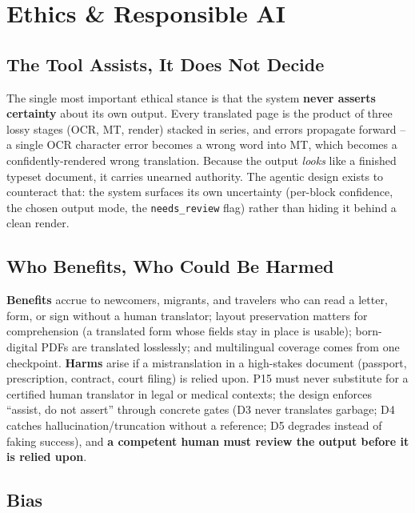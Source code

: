 \documentclass[12pt,a4paper]{article}
\begin{document}
\section{Ethics \& Responsible AI}

\subsection{The Tool Assists, It Does Not Decide}

The single most important ethical stance is that the system \textbf{never asserts certainty} about its own output. Every translated page is the product of three lossy stages (OCR, MT, render) stacked in series, and errors propagate forward -- a single OCR character error becomes a wrong word into MT, which becomes a confidently-rendered wrong translation. Because the output \emph{looks} like a finished typeset document, it carries unearned authority. The agentic design exists to counteract that: the system surfaces its own uncertainty (per-block confidence, the chosen output mode, the \texttt{needs\_review} flag) rather than hiding it behind a clean render.

\subsection{Who Benefits, Who Could Be Harmed}

\textbf{Benefits} accrue to newcomers, migrants, and travelers who can read a letter, form, or sign without a human translator; layout preservation matters for comprehension (a translated form whose fields stay in place is usable); born-digital PDFs are translated losslessly; and multilingual coverage comes from one checkpoint. \textbf{Harms} arise if a mistranslation in a high-stakes document (passport, prescription, contract, court filing) is relied upon. P15 must never substitute for a certified human translator in legal or medical contexts; the design enforces ``assist, do not assert'' through concrete gates (D3 never translates garbage; D4 catches hallucination/truncation without a reference; D5 degrades instead of faking success), and \textbf{a competent human must review the output before it is relied upon}.

\subsection{Bias}
\end{document}
